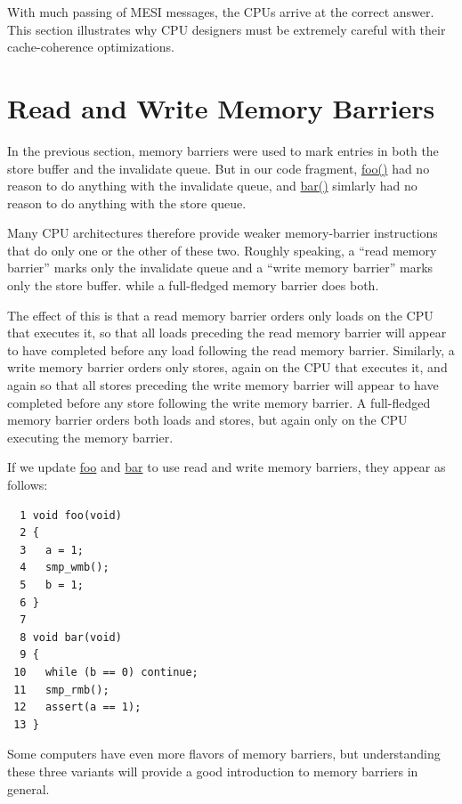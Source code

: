With much passing of MESI messages, the CPUs arrive at the correct answer.
This section illustrates why CPU designers must be extremely careful
with their cache-coherence optimizations.

\section{Read and Write Memory Barriers}
\label{sec:app:whymb:Read and Write Memory Barriers}

In the previous section, memory barriers were used to mark entries in
both the store buffer and the invalidate queue.
But in our code fragment, \url{foo()} had no reason to do anything
with the invalidate queue, and \url{bar()} simlarly had no reason
to do anything with the store queue.

Many CPU architectures therefore provide weaker memory-barrier
instructions that do only one or the other of these two.
Roughly speaking, a ``read memory barrier'' marks only the invalidate
queue and a ``write memory barrier'' marks only the store buffer.
while a full-fledged memory barrier does both.

The effect of this is that a read memory barrier orders only loads
on the CPU that executes it, so that all loads preceding the read memory
barrier will appear to have completed before any load following the
read memory barrier.
Similarly, a write memory barrier orders
only stores, again on the CPU that executes it, and again so that
all stores preceding the write memory barrier will appear to have
completed before any store following the write memory barrier.
A full-fledged memory barrier orders both loads and stores, but again
only on the CPU executing the memory barrier.

If we update \url{foo} and \url{bar} to use read and write memory
barriers, they appear as follows:

\vspace{5pt}
\begin{minipage}[t]{\columnwidth}
\small
\begin{verbatim}
  1 void foo(void)
  2 {
  3   a = 1;
  4   smp_wmb();
  5   b = 1;
  6 }
  7
  8 void bar(void)
  9 {
 10   while (b == 0) continue;
 11   smp_rmb();
 12   assert(a == 1);
 13 }
\end{verbatim}
\end{minipage}
\vspace{5pt}

Some computers have even more flavors of memory barriers, but
understanding these three variants will provide a good introduction
to memory barriers in general.

